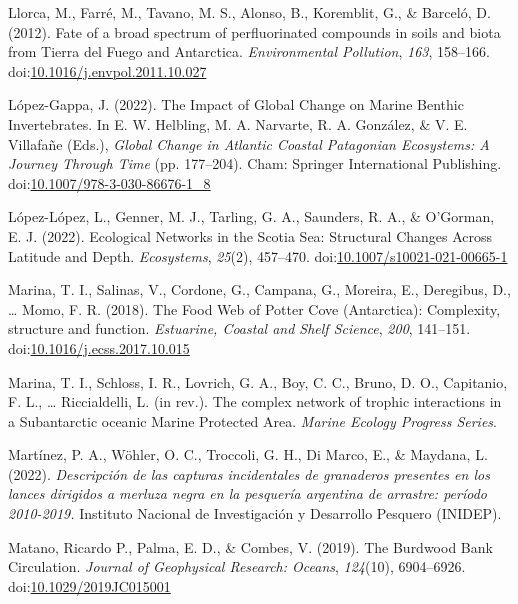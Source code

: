 \documentclass[
]{article}
\newlength{\cslhangindent}
\newenvironment{CSLReferences}[2] %
 {\begin{list}{}{%
  \setlength{\itemindent}{0pt}
  \setlength{\leftmargin}{0pt}
  \setlength{\parsep}{0pt}
  \ifodd #1
   \setlength{\leftmargin}{\cslhangindent}
   \setlength{\itemindent}{-1\cslhangindent}
  \fi
  \setlength{\itemsep}{#2\baselineskip}}}
 {\end{list}}
\begin{document}
\begin{CSLReferences}{1}{0}
Llorca, M., Farré, M., Tavano, M. S., Alonso, B., Koremblit, G., \&
Barceló, D. (2012). Fate of a broad spectrum of perfluorinated compounds
in soils and biota from {Tierra} del {Fuego} and {Antarctica}.
\emph{Environmental Pollution}, \emph{163}, 158--166.
doi:\href{https://doi.org/10.1016/j.envpol.2011.10.027}{10.1016/j.envpol.2011.10.027}

López-Gappa, J. (2022). The {Impact} of {Global Change} on {Marine
Benthic Invertebrates}. In E. W. Helbling, M. A. Narvarte, R. A.
González, \& V. E. Villafañe (Eds.), \emph{Global {Change} in {Atlantic
Coastal Patagonian Ecosystems}: {A Journey Through Time}} (pp.
177--204). {Cham}: {Springer International Publishing}.
doi:\href{https://doi.org/10.1007/978-3-030-86676-1_8}{10.1007/978-3-030-86676-1\_8}

López-López, L., Genner, M. J., Tarling, G. A., Saunders, R. A., \&
O'Gorman, E. J. (2022). Ecological {Networks} in the {Scotia Sea}:
{Structural Changes Across Latitude} and {Depth}. \emph{Ecosystems},
\emph{25}(2), 457--470.
doi:\href{https://doi.org/10.1007/s10021-021-00665-1}{10.1007/s10021-021-00665-1}

Marina, T. I., Salinas, V., Cordone, G., Campana, G., Moreira, E.,
Deregibus, D., \ldots{} Momo, F. R. (2018). The {Food Web} of {Potter
Cove} ({Antarctica}): Complexity, structure and function.
\emph{Estuarine, Coastal and Shelf Science}, \emph{200}, 141--151.
doi:\href{https://doi.org/10.1016/j.ecss.2017.10.015}{10.1016/j.ecss.2017.10.015}

Marina, T. I., Schloss, I. R., Lovrich, G. A., Boy, C. C., Bruno, D. O.,
Capitanio, F. L., \ldots{} Riccialdelli, L. (in rev.). The complex
network of trophic interactions in a {Subantarctic} oceanic {Marine
Protected Area}. \emph{Marine Ecology Progress Series}.

Martínez, P. A., Wöhler, O. C., Troccoli, G. H., Di Marco, E., \&
Maydana, L. (2022). \emph{{Descripción de las capturas incidentales de
granaderos presentes en los lances dirigidos a merluza negra en la
pesquería argentina de arrastre: período 2010-2019.}} {Instituto
Nacional de Investigación y Desarrollo Pesquero (INIDEP)}.

Matano, Ricardo P., Palma, E. D., \& Combes, V. (2019). The {Burdwood
Bank Circulation}. \emph{Journal of Geophysical Research: Oceans},
\emph{124}(10), 6904--6926.
doi:\href{https://doi.org/10.1029/2019JC015001}{10.1029/2019JC015001}


\end{CSLReferences}
\end{document}
